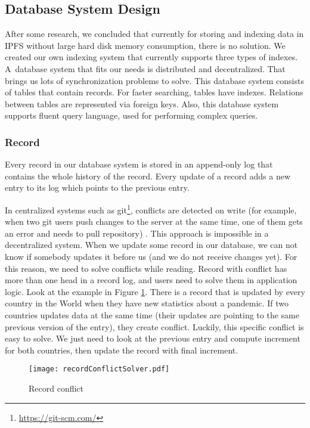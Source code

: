 \subsection{Database System Design}
After some research, we concluded that currently for storing and indexing data in IPFS without large hard disk memory consumption, there is no solution. We created our own indexing system that currently supports three types of indexes. A~database system that fits our needs is distributed and decentralized. That brings us lots of synchronization problems to solve. This database system consists of tables that contain records. For faster searching, tables have indexes. Relations between tables are represented via foreign keys. Also, this database system supports fluent query language, used for performing complex queries.

\subsubsection{Record} 
Every record in our database system is stored in an append-only log that contains the whole history of the record. Every update of a record adds a new entry to its log which points to the previous entry. 

In centralized systems such as git\footnote{\url{https://git-scm.com/}}, conflicts are detected on write (for example, when two git users push changes to the server at the same time, one of them gets an error and needs to pull repository) \cite{chacon2014pro}. This approach is impossible in a decentralized system. When we update some record in our database, we can not know if somebody updates it before us (and we do not receive changes yet). For this reason, we need to solve conflicts while reading. Record with conflict has more than one head in a record log, and users need to solve them in application logic. Look at the example in Figure \ref{recordConflict}. There is a record that is updated by every country in the World when they have new statistics about a pandemic. If two countries updates data at the same time (their updates are pointing to the same previous version of the entry), they create conflict. Luckily, this specific conflict is easy to solve. We just need to look at the previous entry and compute increment for both countries, then update the record with final increment.


\begin{figure}[h]
    \centering
    \texttt{[image: recordConflictSolver.pdf]}
    \caption{Record conflict}
    \label{recordConflict}
\end{figure}


